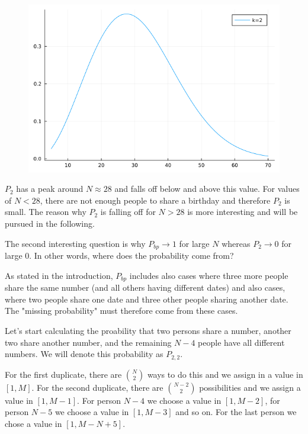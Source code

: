 \begin{figure}[H]
    \centering
    \includegraphics[scale=0.5]{images/2022-12-15-birthday_01.png}
\end{figure}

$P_2$ has a peak around $N \approx 28$ and falls off below and above this value. For values of $N < 28$, there are not enough people to share a birthday and therefore $P_2$ is small. The reason why $P_2$ is falling off for $N > 28$ is more interesting and will be pursued in the following.

The second interesting question is why $P_{bp} \rightarrow 1$ for large $N$ whereas $P_2 \rightarrow 0$ for large $0$. In other words, where does the probability come from?

As stated in the introduction, $P_{bp}$ includes also cases where three more people share the same number (and all others having different dates) and also cases, where two people share one date and three other people sharing another date. The "missing probability" must therefore come from these cases.

Let's start calculating the proability that two persons share a number, another two share another number, and the remaining $N-4$ people have all different numbers. We will denote this probability as $P_{2,2}$.

For the first duplicate, there are ${N \choose 2}$ ways to do this and we assign in a value in $[1,M]$. For the second duplicate, there are ${N-2 \choose 2}$ possibilities and we assign a value in $[1, M-1]$. For person $N-4$ we choose a value in $[1, M-2]$, for person $N-5$ we choose a value in $[1, M-3]$ and so on. For the last person we chose a value in $[1, M-N+5]$. 

